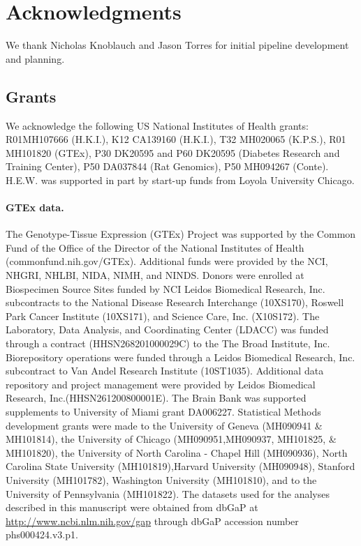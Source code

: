 \documentclass[10pt,letterpaper]{article}
\begin{document}
\section*{Acknowledgments}
We thank Nicholas Knoblauch and Jason Torres for initial pipeline
development and planning.

\subsection*{Grants}\label{grants}

We acknowledge the following US National Institutes of Health grants:
R01MH107666 (H.K.I.), K12 CA139160 (H.K.I.), T32 MH020065 (K.P.S.), R01 MH101820 (GTEx), 
P30 DK20595 and P60 DK20595 (Diabetes Research and
Training Center), P50 DA037844 (Rat Genomics), P50 MH094267 (Conte). H.E.W. was
supported in part by start-up funds from Loyola University Chicago.


\paragraph{GTEx data.}\label{gtex-data}

The Genotype-Tissue Expression (GTEx) Project was supported by the
Common Fund of the Office of the Director of the National Institutes of
Health (commonfund.nih.gov/GTEx). Additional funds were provided by the
NCI, NHGRI, NHLBI, NIDA, NIMH, and NINDS. Donors were enrolled at
Biospecimen Source Sites funded by NCI Leidos Biomedical Research, Inc.
subcontracts to the National Disease Research Interchange (10XS170),
Roswell Park Cancer Institute (10XS171), and Science Care, Inc.
(X10S172). The Laboratory, Data Analysis, and Coordinating Center
(LDACC) was funded through a contract (HHSN268201000029C) to the The
Broad Institute, Inc. Biorepository operations were funded through a
Leidos Biomedical Research, Inc. subcontract to Van Andel Research
Institute (10ST1035). Additional data repository and project management
were provided by Leidos Biomedical Research, Inc.(HHSN261200800001E).
The Brain Bank was supported supplements to University of Miami grant
DA006227. Statistical Methods development grants were made to the
University of Geneva (MH090941 \& MH101814), the University of Chicago
(MH090951,MH090937, MH101825, \& MH101820), the University of North
Carolina - Chapel Hill (MH090936), North Carolina State University
(MH101819),Harvard University (MH090948), Stanford University
(MH101782), Washington University (MH101810), and to the University of
Pennsylvania (MH101822). The datasets used for the analyses described in
this manuscript were obtained from dbGaP at
\url{http://www.ncbi.nlm.nih.gov/gap} through dbGaP accession number
phs000424.v3.p1.
\end{document}
